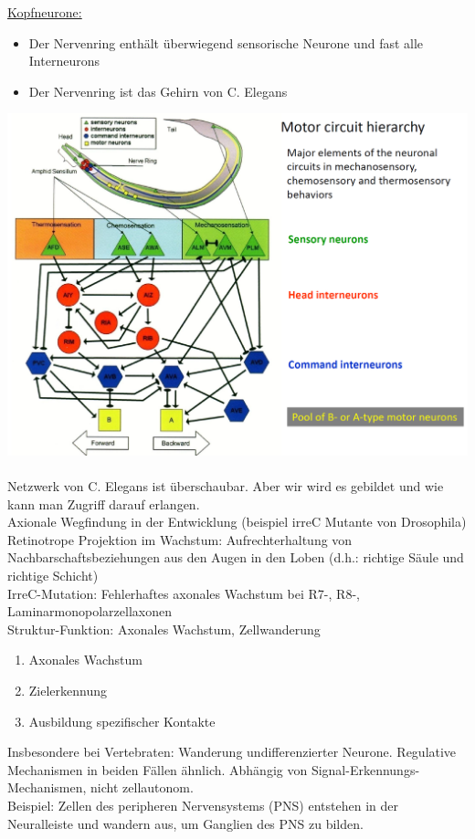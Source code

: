 \underline{Kopfneurone:}
\begin{itemize}
	\item Der Nervenring enthält überwiegend sensorische Neurone und fast alle Interneurons
	\item Der Nervenring ist das Gehirn von C. Elegans
\end{itemize}

\includegraphics[width=1\textwidth]{lectures/160511/pix/c_elegans_neurones.png}
\\\\
Netzwerk von C. Elegans ist überschaubar. Aber wir wird es gebildet und wie kann man Zugriff darauf erlangen.\\

Axionale Wegfindung in der Entwicklung (beispiel irreC Mutante von Drosophila)
Retinotrope Projektion im Wachstum: Aufrechterhaltung von Nachbarschaftsbeziehungen aus den Augen in den Loben (d.h.: richtige Säule und richtige Schicht)\\

IrreC-Mutation: Fehlerhaftes axonales Wachstum bei R7-, R8-, Laminarmonopolarzellaxonen\\

Struktur-Funktion: Axonales Wachstum, Zellwanderung
\begin{enumerate}
	\item Axonales Wachstum
	\item Zielerkennung
	\item Ausbildung spezifischer Kontakte
\end{enumerate}

Insbesondere bei Vertebraten: Wanderung undifferenzierter Neurone.
Regulative Mechanismen in beiden Fällen ähnlich. Abhängig von Signal-Erkennungs-Mechanismen, nicht zellautonom.\\

Beispiel: Zellen des peripheren Nervensystems (PNS) entstehen in der Neuralleiste und wandern aus, um Ganglien des PNS zu bilden.\\